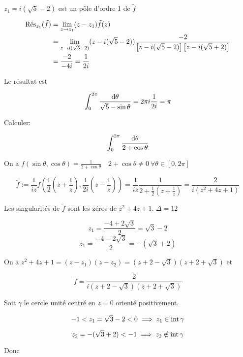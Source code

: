 \begin{enumerate}[label=\alph*)]
\begin{example}[1]
        $z_1 = i(\sqrt{5} - 2)$ est un pôle d'ordre 1 de $\tilde{f}$
        
        \begin{align*}
        \Res_{z_1} (\tilde{f})& = \lim_{z \rightarrow z_1} (z - z_1) \tilde{f}(z) \\&= \lim_{z \rightarrow i(\sqrt{5} - 2)} (z - i(\sqrt{5} - 2)) \frac{-2}{\left[ z - i(\sqrt{5} - 2) \right] \left[ z - i(\sqrt{5} + 2) \right]}
        \\&= \frac{-2}{-4i} = \frac{1}{2i}
        \end{align*}
        
        Le résultat est
        
        \[ \int_0^{2\pi} \frac{\dth}{\sqrt{5} - \sin \theta} = 2 \pi i \frac{1}{2i} = \pi \]
    \end{example}

    \begin{example}[2]
        Calculer:
        
        \[ \int_0^{2\pi} \frac{\dth}{2 + \cos \theta} \]
        
        On a $f(\sin \theta, \cos \theta) = \frac{1}{2 + \cos \theta} \quad 2 + \cos \theta \neq 0 \ \forall \theta \in [0, 2\pi]$
        
        \[ \tilde{f} := \frac{1}{iz} f\left(\frac{1}{2} \left(z + \frac{1}{z}\right), \frac{1}{2i} \left(z - \frac{1}{z}\right)\right) = \frac{1}{iz} \frac{1}{2 + \frac{1}{2} \left(z + \frac{1}{z}\right)} = \frac{2}{i \left(z^2 + 4z + 1\right)} \]
        
        Les singularités de $\tilde{f}$ sont les zéros de $z^2 + 4z + 1$. $\Delta = 12$
        
        \[ z_1 = \frac{-4 + 2\sqrt{3}}{2} = \sqrt{3} - 2 \]
        \[ z_1 = \frac{-4 - 2\sqrt{3}}{2} = -(\sqrt{3} + 2) \]
        
        On a $z^2 +  4z + 1 = (z - z_1)(z - z_2) = (z + 2 - \sqrt{3})(z + 2 + \sqrt{3})$ et
        
        \[ \tilde{f} = \frac{2}{i(z + 2 - \sqrt{3})(z + 2 + \sqrt{3})} \]
        
        Soit $\gamma$ le cercle unité centré en $z = 0$ orienté positivement.
        
        \[ -1 < z_1 = \sqrt{3} - 2 < 0 \implies  z_1 \in \inte \gamma \]
        
        \[ z_2 = -(\sqrt{3} + 2) < -1 \implies  z_2 \notin \inte \gamma \]
        
        Donc
        

\end{example}
\end{enumerate}
